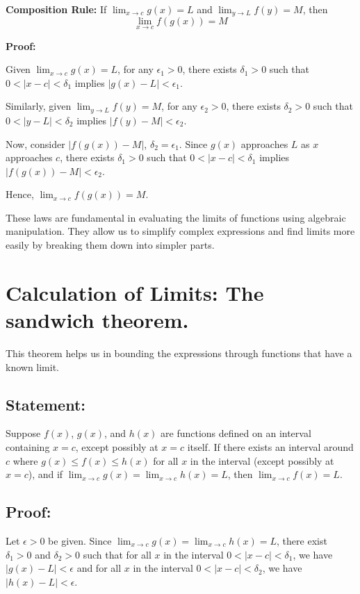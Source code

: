 \textbf{Composition Rule:} If $\lim_{x \to c} g(x) = L$ and $\lim_{y \to L} f(y) = M$, then
\[ \lim_{x \to c} f(g(x)) = M \]

\textbf{Proof:} \begin{outline}
Given $\lim_{x \to c} g(x) = L$, for any $\epsilon_1 > 0$, there exists $\delta_1 > 0$ such that $0 < |x - c| < \delta_1$ implies $|g(x) - L| < \epsilon_1$.

Similarly, given $\lim_{y \to L} f(y) = M$, for any $\epsilon_2 > 0$, there exists $\delta_2 > 0$ such that $0 < |y - L| < \delta_2$ implies $|f(y) - M| < \epsilon_2$.

Now, consider $|f(g(x)) - M|$, $\delta_2=\epsilon_1$. Since $g(x)$ approaches $L$ as $x$ approaches $c$, there exists $\delta_1 > 0$ such that $0 < |x - c| < \delta_1$ implies $|f(g(x)) - M| < \epsilon_2$.

Hence, $\lim_{x \to c} f(g(x)) = M$.

\end{outline} \vspace{1cm} \hline

These laws are fundamental in evaluating the limits of functions using algebraic manipulation. They allow us to simplify complex expressions and find limits more easily by breaking them down into simpler parts.


\section{Calculation of Limits: The sandwich theorem.}

This theorem helps us in bounding the expressions through functions that have a known limit.

\subsection*{Statement:}
Suppose $f(x)$, $g(x)$, and $h(x)$ are functions defined on an interval containing $x = c$, except possibly at $x = c$ itself. If there exists an interval around $c$ where $g(x) \leq f(x) \leq h(x)$ for all $x$ in the interval (except possibly at $x = c$), and if $\lim_{x \to c} g(x) = \lim_{x \to c} h(x) = L$, then $\lim_{x \to c} f(x) = L$.

\subsection*{Proof:}
Let $\epsilon > 0$ be given. Since $\lim_{x \to c} g(x) = \lim_{x \to c} h(x) = L$, there exist $\delta_1 > 0$ and $\delta_2 > 0$ such that for all $x$ in the interval $0 < |x - c| < \delta_1$, we have $|g(x) - L| < \epsilon$ and for all $x$ in the interval $0 < |x - c| < \delta_2$, we have $|h(x) - L| < \epsilon$.

